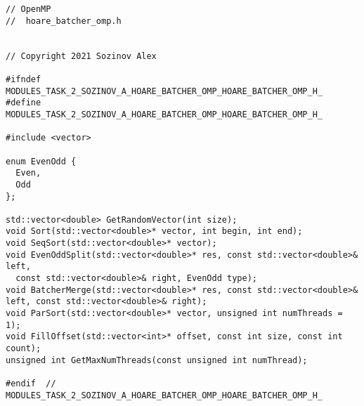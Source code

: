 \documentclass{report}
\begin{document}
\begin{lstlisting}
// OpenMP
//  hoare_batcher_omp.h


// Copyright 2021 Sozinov Alex

#ifndef MODULES_TASK_2_SOZINOV_A_HOARE_BATCHER_OMP_HOARE_BATCHER_OMP_H_
#define MODULES_TASK_2_SOZINOV_A_HOARE_BATCHER_OMP_HOARE_BATCHER_OMP_H_

#include <vector>

enum EvenOdd {
  Even,
  Odd
};

std::vector<double> GetRandomVector(int size);
void Sort(std::vector<double>* vector, int begin, int end);
void SeqSort(std::vector<double>* vector);
void EvenOddSplit(std::vector<double>* res, const std::vector<double>& left,
  const std::vector<double>& right, EvenOdd type);
void BatcherMerge(std::vector<double>* res, const std::vector<double>& left, const std::vector<double>& right);
void ParSort(std::vector<double>* vector, unsigned int numThreads = 1);
void FillOffset(std::vector<int>* offset, const int size, const int count);
unsigned int GetMaxNumThreads(const unsigned int numThread);

#endif  // MODULES_TASK_2_SOZINOV_A_HOARE_BATCHER_OMP_HOARE_BATCHER_OMP_H_

\end{lstlisting}
\end{document}
